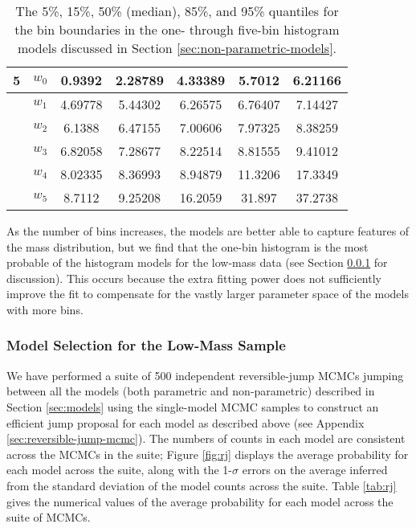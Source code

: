 \documentclass[preprint]{aastex}
\begin{document}
\begin{table}
\begin{center}
\begin{tabular}{|c|c|c|c|c|c|c|}
      \hline \hline
      5 & $w_0$ & 0.9392 & 2.28789 & 4.33389 & 5.7012 & 6.21166 \\
      \hline
        & $w_1$ & 4.69778 & 5.44302 & 6.26575 & 6.76407 & 7.14427 \\
      \hline
        & $w_2$ & 6.1388 & 6.47155 & 7.00606 & 7.97325 & 8.38259 \\
      \hline
        & $w_3$ & 6.82058 & 7.28677 & 8.22514 & 8.81555 & 9.41012 \\
      \hline
        & $w_4$ & 8.02335 & 8.36993 & 8.94879 & 11.3206 & 17.3349 \\
      \hline
        & $w_5$ & 8.7112 & 9.25208 & 16.2059 & 31.897 & 37.2738 \\
      \hline
    \end{tabular}
  \end{center}
  \caption{\label{tab:low-mass-non-parametric} The 5\%, 15\%, 50\%
    (median), 85\%, and 95\% quantiles for the bin boundaries in the
    one- through five-bin histogram models discussed in Section
    \ref{sec:non-parametric-models}.}
\end{table}

As the number of bins increases, the models are better able to capture
features of the mass distribution, but we find that the one-bin
histogram is the most probable of the histogram models for the
low-mass data (see Section \ref{sec:low-mass-model-selection} for
discussion).  This occurs because the extra fitting power does not
sufficiently improve the fit to compensate for the vastly larger
parameter space of the models with more bins.

\subsubsection{Model Selection for the Low-Mass Sample}
\label{sec:low-mass-model-selection}
We have performed a suite of 500 independent reversible-jump MCMCs
jumping between all the models (both parametric and non-parametric)
described in Section \ref{sec:models} using the single-model MCMC
samples to construct an efficient jump proposal for each model as
described above (see Appendix \ref{sec:reversible-jump-mcmc}).  The
numbers of counts in each model are consistent across the MCMCs in the
suite; Figure \ref{fig:rj} displays the average probability for each
model across the suite, along with the 1-$\sigma$ errors on the
average inferred from the standard deviation of the model counts
across the suite.  Table \ref{tab:rj} gives the numerical values of
the average probability for each model across the suite of MCMCs.
\end{document}
